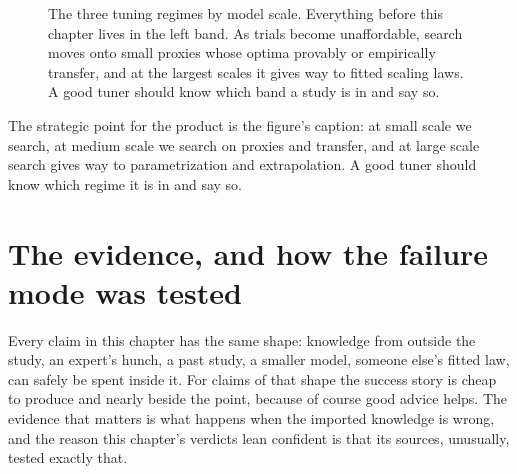 \begin{figure}[t]
\centering
{}
\caption{The three tuning regimes by model scale. Everything before this
chapter lives in the left band. As trials become unaffordable, search
moves onto small proxies whose optima provably or empirically transfer,
and at the largest scales it gives way to fitted scaling laws. A good
tuner should know which band a study is in and say so.}
\label{fig:regimes}
\end{figure}

The strategic point for the product is the figure's caption: at small
scale we search, at medium scale we search on proxies and transfer, and
at large scale search gives way to parametrization and extrapolation. A
good tuner should know which regime it is in and say so.

\section{The evidence, and how the failure mode was tested}
\label{sec:prior-evidence}

Every claim in this chapter has the same shape: knowledge from outside
the study, an expert's hunch, a past study, a smaller model, someone
else's fitted law, can safely be spent inside it. For claims of that
shape the success story is cheap to produce and nearly beside the
point, because of course good advice helps. The evidence that matters
is what happens when the imported knowledge is wrong, and the reason
this chapter's verdicts lean confident is that its sources, unusually,
tested exactly that.

